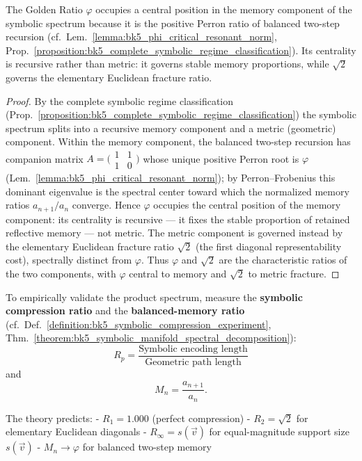 \begin{corollary}
\label{corollary:bk5_phi_centrality_principle}
The Golden Ratio $\varphi$ occupies a central position in the memory component
of the symbolic spectrum because it is the positive Perron ratio of balanced
two-step recursion
(cf.~Lem.~\ref{lemma:bk5_phi_critical_resonant_norm},
Prop.~\ref{proposition:bk5_complete_symbolic_regime_classification}).  Its
centrality is recursive rather than metric: it governs stable memory
proportions, while $\sqrt{2}$ governs the elementary Euclidean fracture ratio.
\end{corollary}
\begin{proof}
\label{proof:bk5_phi_centrality_principle}
\leavevmode
By the complete symbolic regime classification (Prop.~\ref{proposition:bk5_complete_symbolic_regime_classification}) the symbolic spectrum splits into a recursive memory component and a metric (geometric) component. Within the memory component, the balanced two-step recursion has companion matrix $A=\big(\begin{smallmatrix}1&1\\1&0\end{smallmatrix}\big)$ whose unique positive Perron root is $\varphi$ (Lem.~\ref{lemma:bk5_phi_critical_resonant_norm}); by Perron--Frobenius this dominant eigenvalue is the spectral center toward which the normalized memory ratios $a_{n+1}/a_n$ converge. Hence $\varphi$ occupies the central position of the memory component: its centrality is recursive --- it fixes the stable proportion of retained reflective memory --- not metric. The metric component is governed instead by the elementary Euclidean fracture ratio $\sqrt2$ (the first diagonal representability cost), spectrally distinct from $\varphi$. Thus $\varphi$ and $\sqrt2$ are the characteristic ratios of the two components, with $\varphi$ central to memory and $\sqrt2$ to metric fracture.
\end{proof}

\begin{definition}
\label{definition:bk5_symbolic_regime_detection}
To empirically validate the product spectrum, measure the \textbf{symbolic
compression ratio} and the \textbf{balanced-memory ratio}
(cf.~Def.~\ref{definition:bk5_symbolic_compression_experiment},
Thm.~\ref{theorem:bk5_symbolic_manifold_spectral_decomposition}):
$$R_p = \frac{\text{Symbolic encoding length}}{\text{Geometric path length}}$$
and
\[
M_n=\frac{a_{n+1}}{a_n}.
\]

The theory predicts:
- $R_1 = 1.000$ (perfect compression)
- $R_2 = \sqrt{2}$ for elementary Euclidean diagonals
- $R_\infty = s(\vec{v})$ for equal-magnitude support size $s(\vec{v})$
- $M_n\to\varphi$ for balanced two-step memory
\end{definition}

